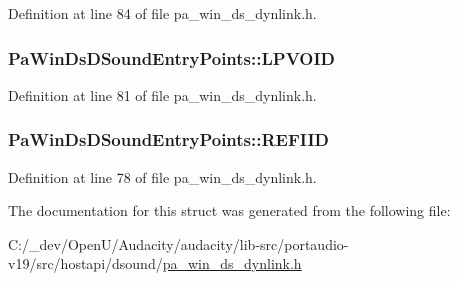 Definition at line 84 of file pa\+\_\+win\+\_\+ds\+\_\+dynlink.\+h.

\subsubsection[{\texorpdfstring{L\+P\+V\+O\+ID}{LPVOID}}]{\setlength{\rightskip}{0pt plus 5cm}Pa\+Win\+Ds\+D\+Sound\+Entry\+Points\+::\+L\+P\+V\+O\+ID}\hypertarget{struct_pa_win_ds_d_sound_entry_points_ae12b3be24bb1e429665a08c875adb886}{}\label{struct_pa_win_ds_d_sound_entry_points_ae12b3be24bb1e429665a08c875adb886}


Definition at line 81 of file pa\+\_\+win\+\_\+ds\+\_\+dynlink.\+h.

\subsubsection[{\texorpdfstring{R\+E\+F\+I\+ID}{REFIID}}]{\setlength{\rightskip}{0pt plus 5cm}Pa\+Win\+Ds\+D\+Sound\+Entry\+Points\+::\+R\+E\+F\+I\+ID}\hypertarget{struct_pa_win_ds_d_sound_entry_points_ac227aa0d722376a62c9202272494ea66}{}\label{struct_pa_win_ds_d_sound_entry_points_ac227aa0d722376a62c9202272494ea66}


Definition at line 78 of file pa\+\_\+win\+\_\+ds\+\_\+dynlink.\+h.



The documentation for this struct was generated from the following file\+:\begin{DoxyCompactItemize}
\item 
C\+:/\+\_\+dev/\+Open\+U/\+Audacity/audacity/lib-\/src/portaudio-\/v19/src/hostapi/dsound/\hyperlink{pa__win__ds__dynlink_8h}{pa\+\_\+win\+\_\+ds\+\_\+dynlink.\+h}\end{DoxyCompactItemize}
